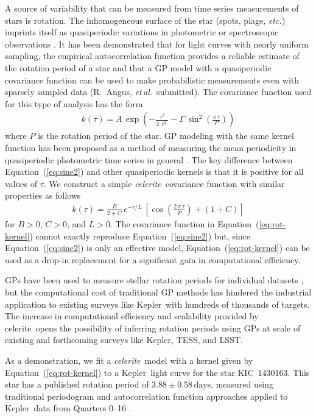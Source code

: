 \documentclass[manuscript, letterpaper]{aastex6}
\newcommand{\project}[1]{\textsf{#1}}
\newcommand{\kepler}{\project{Kepler}}
\newcommand{\lsst}{\project{LSST}}
\newcommand{\tess}{\project{TESS}}
\newcommand{\celerite}{\project{celerite}}
\newcommand{\celeriteterm}{\emph{celerite}}
\newcommand{\foreign}[1]{\emph{#1}}
\newcommand{\etal}{\foreign{et\,al.}}
\newcommand{\etc}{\foreign{etc.}}
\renewcommand{\eqref}[1]{\ref{eq:#1}}
\newcommand{\Eq}[1]{Equation~(\eqref{#1})}
\newcommand{\eq}[1]{\Eq{#1}}
\newcommand{\eqlabel}[1]{\label{eq:#1}}
\newcommand{\response}[1]{{\color{blue}#1}}
\begin{document}
A source of variability that can be measured from time series measurements of
stars is rotation.
The inhomogeneous surface of the star (spots, plage, \etc) imprints itself as
quasiperiodic variations in photometric or spectroscopic observations
\citep{Dumusque:2014}.
It has been demonstrated that for light curves with nearly uniform sampling,
the empirical autocorrelation function provides a reliable estimate of the
rotation period of a star \citep{Mcquillan:2013, Mcquillan:2014, Aigrain:2015}
and that a GP model with a
quasiperiodic covariance function can be used to make probabilistic
measurements even with sparsely sampled data (R.~Angus, \etal\ submitted).
The covariance function used for this type of analysis has the form
\begin{eqnarray}\eqlabel{sine2}
k(\tau) = A\,\exp\left(-\frac{\tau^2}{2\,\ell^2} -
    \Gamma\,\sin^2\left(\frac{\pi\,\tau}{P} \right) \right)
\end{eqnarray}
where $P$ is the rotation period of the star.
GP modeling with the same kernel function has been proposed as a method of
measuring the mean periodicity in quasiperiodic photometric time series in
general \citep{Wang:2012}.
The key difference between \eq{sine2} and other quasiperiodic kernels is that
it is positive for all values of $\tau$.
We construct a simple \celeriteterm\ covariance function with similar
properties as follows
\begin{eqnarray}\eqlabel{rot-kernel}
k(\tau) = \frac{B}{2+C}\,e^{-\tau/L}\,\left[
    \cos\left(\frac{2\,\pi\,\tau}{P}\right) + (1 + C)
\right]
\end{eqnarray}
for $B>0$, $C>0$, and $L>0$.
The covariance function in \eq{rot-kernel} cannot exactly reproduce \eq{sine2}
but, since \eq{sine2} is only an effective model, \eq{rot-kernel} can be used
as a drop-in replacement for a significant gain in computational efficiency.

\response{GPs have been used to measure stellar rotation periods for
individual datasets \citep[for example][]{Littlefair:2017}, but the
computational cost of traditional GP methods has hindered the industrial
application to existing surveys like \kepler\ with hundreds of thousands of
targets.
The increase in computational efficiency and scalability provided by
\celerite\ opens the possibility of inferring rotation periods using GPs at
scale of existing and forthcoming surveys like \kepler, \tess, and \lsst.
}

As a demonstration, we fit a \celeriteterm\ model with a kernel given
by \eq{rot-kernel} to a \kepler\ light curve for the star KIC~1430163.
This star has a published rotation period of $3.88 \pm 0.58\,\mathrm{days}$,
measured using traditional periodogram and autocorrelation function approaches
applied to \kepler\ data from Quarters 0--16 \citep{Mathur:2014}.
\end{document}
